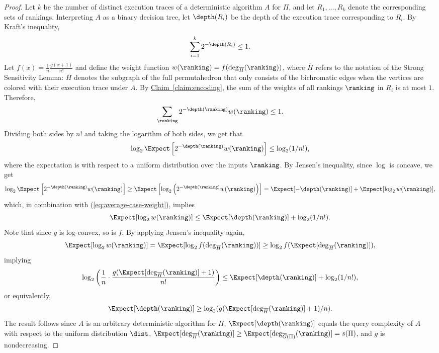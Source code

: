 \documentclass[11pt]{article}
\numberwithin{equation}{section}
\theoremstyle{definition}
\theoremstyle{plain}
\newcommand{\expref}[2]{\hyperref[#2]{#1~\ref{#2}}}
\begin{document}
\begin{proof}
	Let $k$ be the number of distinct execution traces of a deterministic algorithm $A$ for $\Pi$, and let $R_1,\dots,R_k$ denote the corresponding sets of rankings. Interpreting $A$ as a binary decision tree, let $\depth(R_i)$ be the depth of the execution trace corresponding to $R_i$. By Kraft's inequality,
	\[\sum_{i=1}^{k}2^{-\depth(R_i)}\le 1. \]
	Let $f(x)=\frac{1}{n}\frac{g(x+1)}{n!}$ and define the weight function $w(\ranking)=f(\deg_{\overline{H}}(\ranking))$, where $\overline{H}$ refers to the notation of the Strong Sensitivity Lemma: $\overline{H}$ denotes the subgraph of the full permutahedron that only consists of the bichromatic edges when the vertices are colored with their execution trace under $A$. By \expref{Claim}{claim:encoding}, the sum of the weights of all  rankings $\ranking$ in $R_i$ is at most $1$. Therefore,
	\[\sum_{\ranking} 2^{-\depth(\ranking)} w(\ranking) \le 1. \]
	Dividing both sides by $n!$ and taking the logarithm of both sides, we get that
	\begin{equation}
		\label{eq:average-case-weight}
		\log_2 \Expect\left[2^{-\depth(\ranking)}w(\ranking)\right] \le \log_2(1/n!),
	\end{equation}
	where the expectation is with respect to a uniform distribution over the inputs $\ranking$.
	By Jensen's inequality, since $\log$ is concave, we get 
	\[\log_2 \Expect\left[2^{-\depth(\ranking)}w(\ranking)\right] \ge \Expect\left[\log_2 \left(2^{-\depth(\ranking)}w(\ranking) \right)\right]= \Expect[-\depth(\ranking)]+\Expect[\log_2 w(\ranking)], \]
	which, in combination with (\ref{eq:average-case-weight}), implies
	\[\Expect[\log_2 w(\ranking)] \le \Expect[\depth(\ranking)]+\log_2(1/n!). \]
	Note that since $g$ is log-convex, so is $f$. By applying Jensen's inequality again,  
	\[\Expect[\log_2 w(\ranking)]=\Expect[\log_2 f(\deg_{\overline{H}}(\ranking))]\ge \log_2 f(\Expect[\deg_{\overline{H}}(\ranking)]),\]
	implying 
	\[ \log_2\left(\frac{1}{n}\cdot \frac{g(\Expect[\deg_{\overline{H}}(\ranking)]+1)}{n!}\right) \le \Expect[\depth(\ranking)]+\log_2(1/n!), \]
	or equivalently,
	\[ \Expect[\depth(\ranking)] \ge \log_2(g(\Expect[\deg_{\overline{H}}(\ranking)]+1)/n). \]
	The result follows since $A$ is an arbitrary deterministic algorithm for $\Pi$, $\Expect[\depth(\ranking)]$ equals the query complexity of $A$ with respect to the uniform distribution $\dist$, $\Expect[\deg_{\overline{H}}(\ranking)] \ge \Expect[\deg_{\overline{G}(\Pi)}(\ranking)] = s(\Pi)$, and $g$ is nondecreasing. 
\end{proof}
\end{document}
